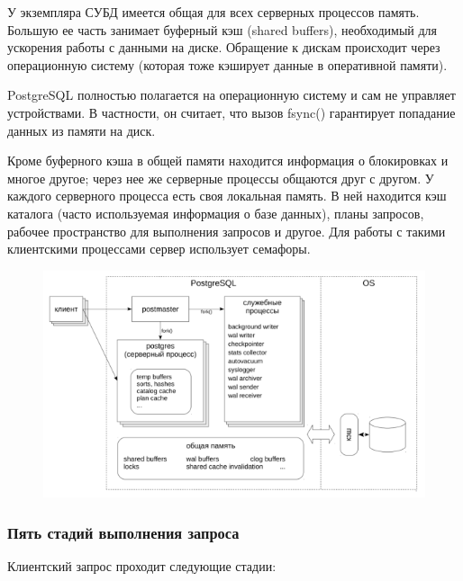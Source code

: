 У экземпляра СУБД имеется общая для всех серверных процессов память.
Большую ее часть занимает буферный кэш (shared buffers), необходимый
для ускорения работы с данными на диске. Обращение к дискам
происходит через операционную систему (которая тоже кэширует данные в
оперативной памяти).

PostgreSQL полностью полагается на операционную систему и сам не
управляет устройствами. В частности, он считает, что вызов fsync()
гарантирует попадание данных из
памяти на диск.

Кроме буферного кэша в общей памяти находится информация о
блокировках и многое
другое; через нее же серверные процессы общаются друг с другом. У
каждого серверного
процесса есть своя локальная память. В ней находится кэш каталога (часто
используемая
информация о базе данных), планы запросов, рабочее пространство для
выполнения запросов и другое. Для работы с такими клиентскими
процессами сервер использует семафоры.

\begin{figure}[ht!]
	\centering
	\includegraphics[width=18cm, keepaspectratio]{assets/plan-1.png}
	\caption{} 
\end{figure}
\FloatBarrier

\subsubsection{Пять стадий выполнения запроса}

Клиентский запрос проходит следующие стадии:

